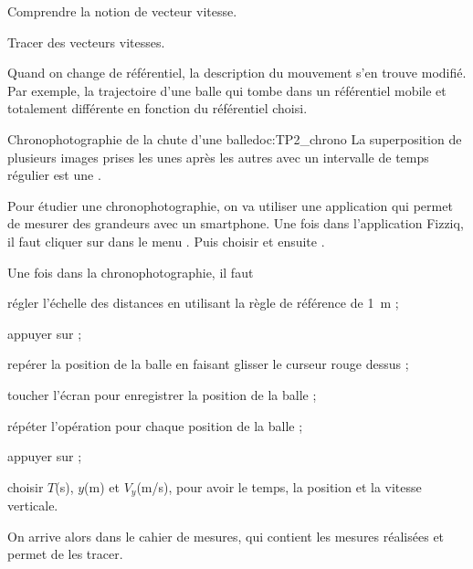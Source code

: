 \teteSndMouv

\nomPrenomClasse

\vspace*{-12pt}

\begin{objectifs}
  \item Comprendre la notion de vecteur vitesse.
  \item Tracer des vecteurs vitesses.
\end{objectifs}

\begin{contexte}
  Quand on change de référentiel, la description du mouvement s'en trouve modifié.
  Par exemple, la trajectoire d'une balle qui tombe dans un référentiel mobile et totalement différente en fonction du référentiel choisi.

\end{contexte}




\begin{doc}{Chronophotographie de la chute d'une balle}{doc:TP2_chrono}  
  La superposition de plusieurs images prises les unes après les autres avec un intervalle de temps régulier est une .

  Pour étudier une chronophotographie, on va utiliser  une application qui permet de mesurer des grandeurs avec un smartphone.
  Une fois dans l'application Fizziq, il faut cliquer sur  dans le menu . Puis choisir  et ensuite . 

  Une fois dans la chronophotographie, il faut 
  \begin{protocole}
    \item régler l'échelle des distances en utilisant la règle de référence de \qty{1}{\m} ;
    \item appuyer sur  ;
    \item repérer la position de la balle en faisant glisser le curseur rouge dessus ;
    \item toucher l'écran pour enregistrer la position de la balle ;
    \item répéter l'opération pour chaque position de la balle ;
    \item appuyer sur  ;
    \item choisir $T$(s), $y$(m) et $V_y$(m/s), pour avoir le temps, la position et la vitesse verticale.
  \end{protocole}
  On arrive alors dans le cahier de mesures, qui contient les mesures réalisées et permet de les tracer.
\end{doc}

